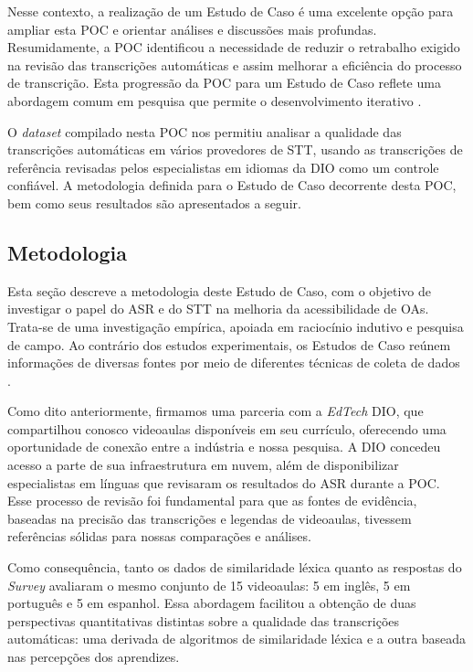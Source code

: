 Nesse contexto, a realização de um Estudo de Caso é uma excelente opção para ampliar esta POC e orientar análises e discussões mais profundas. Resumidamente, a POC identificou a necessidade de reduzir o retrabalho exigido na revisão das transcrições automáticas e assim melhorar a eficiência do processo de transcrição. Esta progressão da POC para um Estudo de Caso reflete uma abordagem comum em pesquisa que permite o desenvolvimento iterativo \cite{Runeson2009}. 

O \textit{dataset} compilado nesta POC nos permitiu analisar a qualidade das transcrições automáticas em vários provedores de STT, usando as transcrições de referência revisadas pelos especialistas em idiomas da DIO como um controle confiável. A metodologia definida para o Estudo de Caso decorrente desta POC, bem como seus resultados são apresentados a seguir.

\subsection{Metodologia}

Esta seção descreve a metodologia deste Estudo de Caso, com o objetivo de investigar o papel do ASR e do STT na melhoria da acessibilidade de OAs. Trata-se de uma investigação empírica, apoiada em raciocínio indutivo e pesquisa de campo. Ao contrário dos estudos experimentais, os Estudos de Caso reúnem informações de diversas fontes por meio de diferentes técnicas de coleta de dados \cite{Sommerville2015}.

Como dito anteriormente, firmamos uma parceria com a \textit{EdTech} DIO, que compartilhou conosco videoaulas disponíveis em seu currículo, oferecendo uma oportunidade de conexão entre a indústria e nossa pesquisa. A DIO concedeu acesso a parte de sua infraestrutura em nuvem, além de disponibilizar especialistas em línguas que revisaram os resultados do ASR durante a POC. Esse processo de revisão foi fundamental para que as fontes de evidência, baseadas na precisão das transcrições e legendas de videoaulas, tivessem referências sólidas para nossas comparações e análises.

Como consequência, tanto os dados de similaridade léxica quanto as respostas do \textit{Survey} avaliaram o mesmo conjunto de 15 videoaulas: 5 em inglês, 5 em português e 5 em espanhol. Essa abordagem facilitou a obtenção de duas perspectivas quantitativas distintas sobre a qualidade das transcrições automáticas: uma derivada de algoritmos de similaridade léxica e a outra baseada nas percepções dos aprendizes.

